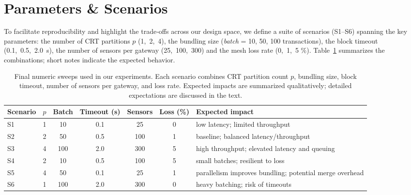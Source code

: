 \section{Parameters \& Scenarios}
\label{sec:params-scenarios}

To facilitate reproducibility and highlight the trade‑offs across our design space, we define a suite of scenarios (S1–S6) spanning the key parameters: the number of CRT partitions $p$ (1,~2,~4), the bundling size (\emph{batch} = 10, 50, 100 transactions), the block timeout (0.1,~0.5,~2.0~s), the number of sensors per gateway (25,~100,~300) and the mesh loss rate (0,~1,~5 \%).  Table~\ref{tab:scenarios} summarizes the combinations; short notes indicate the expected behavior.

\begin{table}[!t]
  \centering
  \caption{Final numeric sweeps used in our experiments.  Each scenario combines CRT partition count $p$, bundling size, block timeout, number of sensors per gateway, and loss rate.  Expected impacts are summarized qualitatively; detailed expectations are discussed in the text.}
  \label{tab:scenarios}
  \begin{tabular}{lccccc>{\raggedright\arraybackslash}p{4cm}}
    \toprule
    Scenario & $p$ & Batch & Timeout (s) & Sensors & Loss (\%) & Expected impact \\
    \midrule
    S1 & 1 & 10 & 0.1 & 25  & 0  & low latency; limited throughput \\
    S2 & 2 & 50 & 0.5 & 100 & 1  & baseline; balanced latency/throughput \\
    S3 & 4 & 100 & 2.0 & 300 & 5  & high throughput; elevated latency and queuing \\
    S4 & 2 & 10 & 0.5 & 100 & 5  & small batches; resilient to loss \\
    S5 & 4 & 50 & 0.1 & 25  & 1  & parallelism improves bundling; potential merge overhead \\
    S6 & 1 & 100 & 2.0 & 300 & 0  & heavy batching; risk of timeouts \\
    \bottomrule
  \end{tabular}
\end{table}

